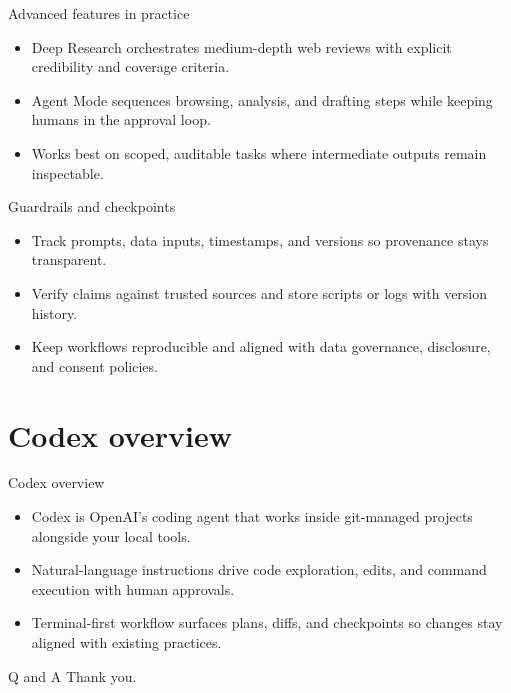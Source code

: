 \documentclass[aspectratio=169,professionalfonts]{beamer}
\begin{document}
\begin{frame}{Advanced features in practice}
  \begin{itemize}
    \item Deep Research orchestrates medium-depth web reviews with explicit credibility and coverage criteria.
    \item Agent Mode sequences browsing, analysis, and drafting steps while keeping humans in the approval loop.
    \item Works best on scoped, auditable tasks where intermediate outputs remain inspectable.
  \end{itemize}
\end{frame}

\begin{frame}{Guardrails and checkpoints}
  \begin{itemize}
    \item Track prompts, data inputs, timestamps, and versions so provenance stays transparent.
    \item Verify claims against trusted sources and store scripts or logs with version history.
    \item Keep workflows reproducible and aligned with data governance, disclosure, and consent policies.
  \end{itemize}
\end{frame}

\section{Codex overview}

\begin{frame}{Codex overview}
  \begin{itemize}
    \item Codex is OpenAI's coding agent that works inside git-managed projects alongside your local tools.
    \item Natural-language instructions drive code exploration, edits, and command execution with human approvals.
    \item Terminal-first workflow surfaces plans, diffs, and checkpoints so changes stay aligned with existing practices.
  \end{itemize}
\end{frame}

\begin{frame}{Q and A}
  \centering Thank you.
\end{frame}
\end{document}
